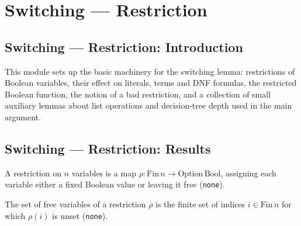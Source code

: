 \section{Switching --- Restriction}
\subsection*{Switching --- Restriction: Introduction}

This module sets up the basic machinery for the switching lemma: restrictions of
Boolean variables, their effect on literals, terms and DNF formulas, the restricted
Boolean function, the notion of a bad restriction, and a collection of small auxiliary
lemmas about list operations and decision-tree depth used in the main argument.

\subsection*{Switching --- Restriction: Results}

\begin{definition}[Restriction]
\label{SwitchingLemma.Restriction}
\leanok
{}
A restriction on $n$ variables is a map $\rho : \mathrm{Fin}\,n \to \mathrm{Option}\,\mathrm{Bool}$,
assigning each variable either a fixed Boolean value or leaving it free (\texttt{none}).
\end{definition}

\begin{definition}
\label{SwitchingLemma.Restriction.freeVars}
\leanok
{}
The set of free variables of a restriction $\rho$ is the finite set of indices
$i \in \mathrm{Fin}\,n$ for which $\rho(i)$ is unset (\texttt{none}).
\end{definition}

